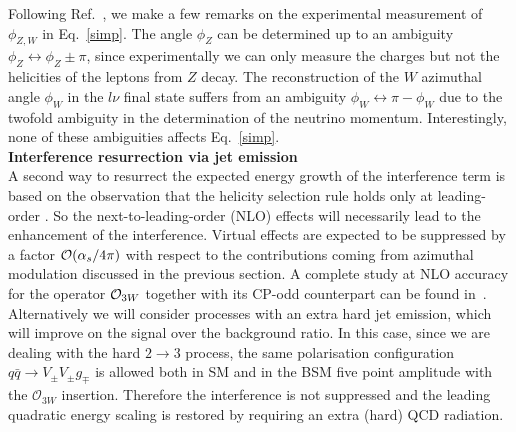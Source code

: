  
 Following Ref.~\cite{Panico:2017frx}, we make a few remarks on the experimental measurement  of $\phi_{Z,W}$ in Eq.~\ref{simp}.
 The angle $\phi_Z$  can be determined up to an ambiguity  $\phi_Z\leftrightarrow \phi_Z \pm \pi$,
 since experimentally we can only measure the charges but not the helicities of the  leptons from $Z$  decay.
 The reconstruction of the $W$  azimuthal  angle $\phi_W$ in the $l\nu$ final state  suffers from an ambiguity  $\phi_W \leftrightarrow \pi-\phi_W$ due to the twofold ambiguity in the determination of the neutrino momentum.
Interestingly, none of these ambiguities  affects  Eq.~\ref{simp}.\\

\noindent
{\bf Interference resurrection via jet emission}\\
\label{jetsol}
A second way to resurrect the expected energy growth of the 
interference term is based on the observation that the helicity 
selection rule holds only at leading-order \cite{Azatov:2017kzw}. 
So the next-to-leading-order (NLO) effects will necessarily lead to the 
enhancement of the interference.
Virtual effects are expected to be suppressed by a factor ${\cal{O}}( 
\alpha_s/4\pi)$ with respect to the contributions coming from azimuthal modulation discussed in the previous section. A complete study at NLO accuracy for the operator ${\cal O}_{3W}$ together with its CP-odd counterpart can be found in~\cite{Azatov:2019xxn}.
Alternatively we will consider processes with an extra hard jet emission, which will improve on the  signal over the  background ratio. 
 In this case,  since   we are dealing with the hard
  $2\to 3$ process,
 the same polarisation configuration $q\bar{q}\to V_{\pm}V_{\pm}g_{\mp}$ is allowed both in SM and in the BSM five point amplitude with the $\mathcal{O}_{3W}$ insertion. Therefore the interference is not suppressed and the leading quadratic energy scaling is restored by requiring an extra (hard) QCD radiation.\\

